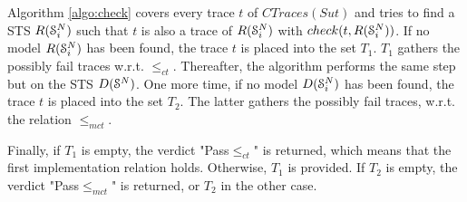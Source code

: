 Algorithm \ref{algo:check} covers every trace $t$ of
$CTraces({Sut})$ and tries to find a STS $R(\EuScript{S}_i^{N})$
such that $t$ is also a trace of $R(\EuScript{S}_i^{N})$ with
$check(t, R(\EuScript{S}_i^{N}))$.  If no model
$R(\EuScript{S}_i^{N})$ has been found, the trace $t$ is placed
into the set $T_1$. $T_1$ gathers the possibly fail traces
w.r.t. $\leq_{ct}$. Thereafter, the algorithm performs the same
step but on the STS $D(\EuScript{S}^{N})$. One more time, if no
model $D(\EuScript{S}_i^{N})$ has been found, the trace $t$ is placed
into the set $T_2$.  The latter gathers the possibly fail traces,
w.r.t. the relation $\leq_{mct}$.

Finally, if $T_1$ is empty, the verdict "Pass$\leq_{ct}$" is
returned, which means that the first implementation relation holds.
Otherwise, $T_1$ is provided. If $T_2$ is empty, the verdict
"Pass$\leq_{mct}$" is returned, or $T_2$ in the other case.

